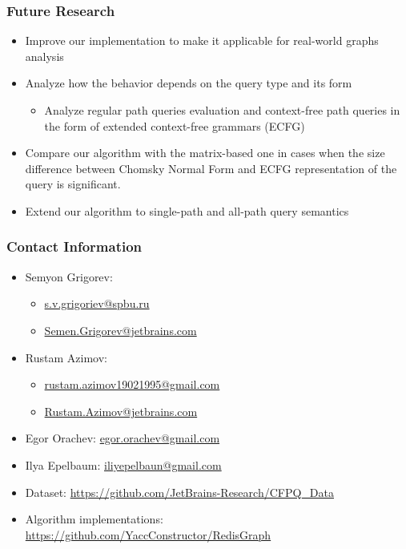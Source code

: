 \documentclass[xcolor=table]{beamer}
\begin{document}
\begin{frame}[fragile] \frametitle{Future Research}
  \begin{itemize}
  	\item Improve our implementation to make it applicable for real-world graphs analysis
  	\pause
  	\item Analyze how the behavior depends on the query type and its form
  	\begin{itemize}
  		\item Analyze regular path queries evaluation and context-free path queries in the form
  		of extended context-free grammars (ECFG)
  	\end{itemize}
  	\pause	
    \item Compare our algorithm with the matrix-based one
    in cases when the size difference between Chomsky Normal Form and ECFG
    representation of the query is significant.
    \pause
    \item Extend our algorithm to single-path and all-path
    query semantics
\end{itemize}
\end{frame}

\begin{frame}
\frametitle{Contact Information}
\begin{itemize}
  \item Semyon Grigorev:
    \begin{itemize}
      \item \href{mailto:s.v.grigoriev@spbu.ru}{s.v.grigoriev@spbu.ru}
      \item \href{mailto:Semen.Grigorev@jetbrains.com}{Semen.Grigorev@jetbrains.com}
    \end{itemize}
  \item Rustam Azimov:
  \begin{itemize}
  	\item \href{mailto:rustam.azimov19021995@gmail.com}{rustam.azimov19021995@gmail.com}
  	\item \href{mailto:Rustam.Azimov@jetbrains.com}{Rustam.Azimov@jetbrains.com}
  \end{itemize}
  \item Egor Orachev: \href{mailto:egor.orachev@gmail.com}{egor.orachev@gmail.com}
  \item Ilya Epelbaum: \href{mailto:iliyepelbaun@gmail.com}{iliyepelbaun@gmail.com}
\vspace{0.5cm}
  \item Dataset: \href{https://github.com/JetBrains-Research/CFPQ_Data}{https://github.com/JetBrains-Research/CFPQ\_Data}
   \item Algorithm implementations: \href{https://github.com/YaccConstructor/RedisGraph}{https://github.com/YaccConstructor/RedisGraph}
\end{itemize}
\vspace{0.1cm}
\end{frame}
\end{document}
